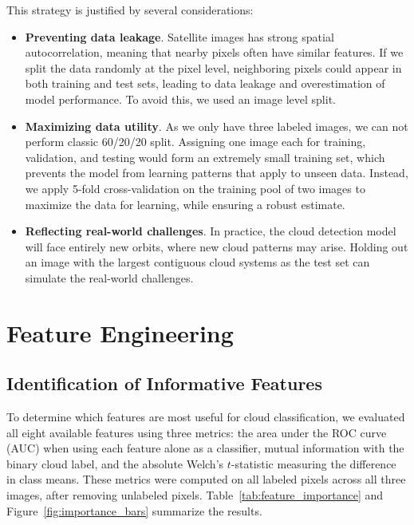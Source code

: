 \documentclass[10pt,letterpaper]{article}
\begin{document}
This strategy is justified by several considerations:
\begin{itemize}
    \item \textbf{Preventing data leakage}. Satellite images has strong spatial autocorrelation, meaning that nearby pixels often have similar features. If we split the data randomly at the pixel level, neighboring pixels could appear in both training and test sets, leading to data leakage and overestimation of model performance. To avoid this, we used an image level split.
    \item \textbf{Maximizing data utility}. As we only have three labeled images, we can not perform classic 60/20/20 split. Assigning one image each for training, validation, and testing would form an extremely small training set, which prevents the model from learning patterns that apply to unseen data. Instead, we apply 5-fold cross-validation on the training pool of two images to maximize the data for learning, while ensuring a robust estimate.

    \item \textbf{Reflecting real-world challenges}. In practice, the cloud detection model will face entirely new orbits, where new cloud patterns may arise. Holding out an image with the largest contiguous cloud systems as the test set can simulate the real-world challenges.
\end{itemize}





\section{Feature Engineering}
\subsection{Identification of Informative Features}
To determine which features are most useful for cloud classification, we evaluated all eight available features using three metrics: the area under the ROC curve (AUC) when using each feature alone as a classifier, mutual information with the binary cloud label, and the absolute Welch's $t$-statistic measuring the difference in class means. These metrics were computed on all labeled pixels across all three images, after removing unlabeled pixels. Table~\ref{tab:feature_importance} and Figure~\ref{fig:importance_bars} summarize the results.
 
\end{document}
